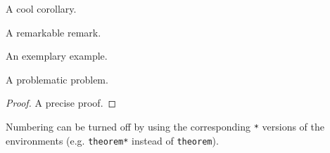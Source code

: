 \documentclass[10pt,oneside,letterpaper]{amsart}
\begin{document}
\begin{corollary}
  A cool corollary. 
\end{corollary}

\begin{remark}
  A remarkable remark. 
\end{remark}

\begin{example}
  An exemplary example. 
\end{example}

\begin{problem}
  A problematic problem. 
\end{problem}

\begin{proof}
  A precise proof.
\end{proof}

Numbering can be turned off by using the corresponding \verb|*| versions of the environments (e.g. \verb|theorem*| instead of \verb|theorem|). 
\end{document}
